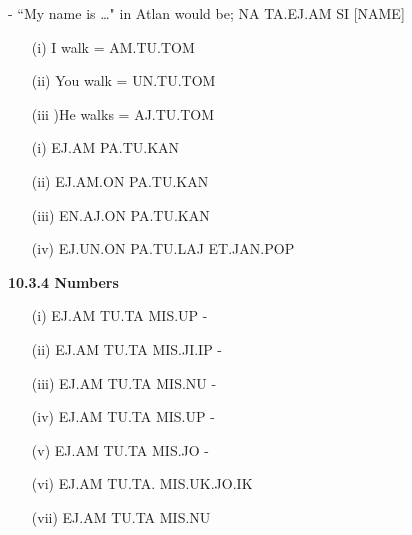  -  “My name is …" in Atlan would be; NA TA.EJ.AM SI [NAME] \na \ta\ej\am \si {}. 

 

\begin{itemize}
    \item[(i)]I walk = AM.TU.TOM \am\tu\tom 

    \item[(ii)]You walk = UN.TU.TOM \un\tu\tom 

    \item[(iii])He walks = AJ.TU.TOM \aj\tu\tom 
\end{itemize}
 




\begin{itemize}
    \item[(i)]  EJ.AM PA.TU.KAN \ej\am \pa\tu\kan 

    \item[(ii)] EJ.AM.ON PA.TU.KAN \ej\am\on \pa\tu\kan 

    \item[(iii)]EN.AJ.ON PA.TU.KAN \ej\aj\on \pa\tu\kan 

    \item[(iv)]EJ.UN.ON PA.TU.LAJ ET.JAN.POP 
\item[] \ej\un\on \pa\tu\laj  \et\jan\pop 
\end{itemize}

\noindent \textbf{10.3.4 Numbers} 
\begin{itemize}
    \item[(i)]EJ.AM TU.TA MIS.UP - \ej\am \tu\ta \mis\up 

    \item[(ii)]EJ.AM TU.TA MIS.JI.IP - \ej\am \tu\ta \mis\ji\ip 

    \item[(iii)]EJ.AM TU.TA MIS.NU - \ej\am \tu\ta \mis\nu 

\item[(iv)] EJ.AM TU.TA MIS.UP  - \ej\am \tu\ta \mis\up 

    \item[(v)] EJ.AM TU.TA MIS.JO - \ej\am \tu\ta \mis\jo 

    \item[(vi)] EJ.AM TU.TA. MIS.UK.JO.IK 

\item[]\ej\am \tu\ta \mis\uk\jo\ik 

    \item[(vii)] EJ.AM TU.TA MIS.NU \ej\am \tu\ta \mis\nu
\end{itemize}
